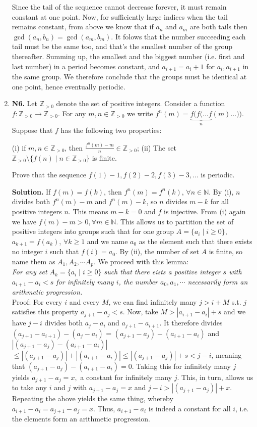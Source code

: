 \documentclass[11pt,a4paper]{article}
\begin{document}
\begin{enumerate}
Since the tail of the sequence cannot decrease forever, it must remain constant at one point. 
Now, for sufficiently large indices when the tail remains constant, 
from above we know that if $a_n$ and $a_m$ are both tails then
$\gcd(a_n, b_n)=\gcd(a_m, b_m)$. 
It folows that the number succeeding each tail must be the same too, and that's the smallest number of the group thereafter. Summing up, the smallest and the biggest number (i.e. first and last number) in a period becomes constant, and $a_{i+1}=a_i +1$ for $a_i, a_{i+1}$ in the same group. We therefore conclude that the groups must be identical at one point, hence eventually periodic.

\item\textbf{N6.} Let $\mathbb{Z}_{>0}$ denote the set of positive integers. Consider a function $f: \mathbb{Z}_{>0} \to \mathbb{Z}_{>0}$. For any $m, n \in \mathbb{Z}_{>0}$ we write $f^n(m) = \underbrace{f(f(\ldots f}_{n}(m)\ldots))$. Suppose that $f$ has the following two properties:

(i) if $m, n \in \mathbb{Z}_{>0}$, then $\frac{f^n(m) - m}{n} \in \mathbb{Z}_{>0}$;
(ii) The set $\mathbb{Z}_{>0} \setminus \{f(n) \mid n\in \mathbb{Z}_{>0}\}$ is finite.

Prove that the sequence $f(1) - 1, f(2) - 2, f(3) - 3, \ldots$ is periodic.

\textbf{Solution.} If $f(m)=f(k)$, then $f^n(m)=f^n(k)$, $\forall n\in\mathbb{N}$. By (i), $n$ divides both $f^n(m)-m$ and $f^n(m)-k$, so $n$ divides $m-k$ for all positive integers $n$. This means $m-k=0$ and $f$ is injective. From (i) again we have $f(m)-m>0,\forall m\in\mathbb{N}$. This allows us to partition the set of positive integers into groups such that for one group $A=\{a_i\mid i\ge 0\}$, $a_{k+1}=f(a_k)$, $\forall k\ge 1$ and we name $a_0$ as the element such that there exists no integer $i$ such that $f(i)=a_0$. By (ii), the number of set $A$ is finite, so name them as $A_1, A_2, \cdots A_p$. We proceed with this lemma:\\
\emph{For any set $A_k=\{a_i\mid i\ge 0\}$ such that there eists a positive integer $s$ with $a_{i+1}-a_i<s$ for infinitely many $i$, the number $a_0, a_1,\cdots $ necessarily form an arithmetic progression.}\\
Proof: For every $i$ and every $M$, we can find infinitely many $j>i+M$ s.t. $j$ satisfies this property  $a_{j+1}-a_j<s$. Now, take $M>|a_{i+1}-a_{i}|+s$ and we have $j-i$ divides both $a_j-a_i$ and $a_{j+1}-a_{i+1}$. It therefore divides $(a_{j+1}-a_{i+1})-(a_j-a_i)$ = $(a_{j+1}-a_{j})-(a_{i+1}-a_i)$ and $|(a_{j+1}-a_{j})-(a_{i+1}-a_i)|$ $\le |(a_{j+1}-a_{j})|+|(a_{i+1}-a_i)|\le |(a_{j+1}-a_{j})|+s<j-i$, meaning that $(a_{j+1}-a_{j})-(a_{i+1}-a_i)=0$. Taking this for infinitely many $j$ yields $a_{j+1}-a_{j}=x,$ a constant for infinitely many $j$. This, in turn, allows us to take any $i$ and $j$ with $a_{j+1}-a_{j}=x$ and $j-i>|(a_{j+1}-a_{j})|+x$. Repeating the above yields the same thing, whereby $a_{i+1}-a_{i}=a_{j+1}-a_j=x$. Thus, $a_{i+1}-a_i$ is indeed a constant for all $i$, i.e. the elements form an arithmetic progression. 


\end{enumerate}
\end{document}
